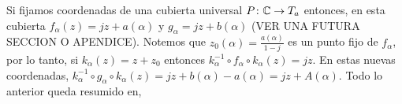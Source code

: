 Si fijamos coordenadas de una cubierta universal $P\colon \mathbb{C}\rightarrow T_{a}$ entonces, en esta cubierta $f_{\alpha}(z)=jz+a(\alpha)$ y $g_{\alpha}=jz+b(\alpha)$ (VER UNA FUTURA SECCION O APENDICE). Notemos que $z_{0}(\alpha)=\tfrac{a(\alpha)}{1-j}$ es un punto fijo de $f_{\alpha}$, por lo tanto, si $k_{\alpha}(z)=z+z_{0}$ entonces $k_{\alpha}^{-1}\circ f_{\alpha}\circ k_{\alpha}(z)=jz$. En estas nuevas coordenadas, $k_{\alpha}^{-1}\circ g_{\alpha}\circ k_{\alpha}(z)=jz+b(\alpha)-a(\alpha)=jz+A(\alpha)$. Todo lo anterior queda resumido en,

\begin{Proposicion}
\label{Prop:GrupoHolonomia}

\end{Proposicion}

